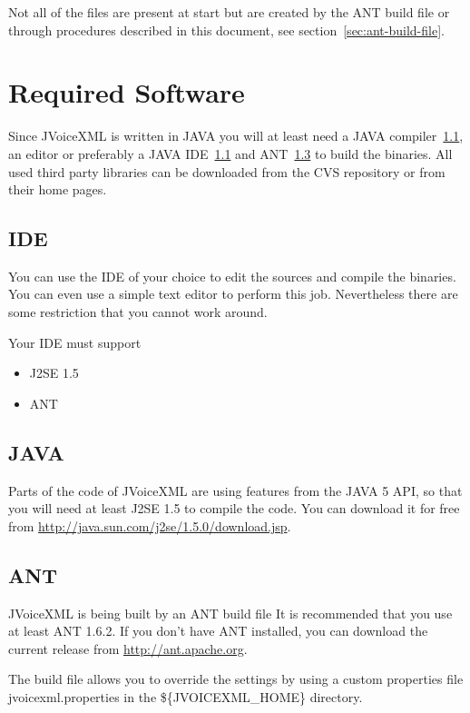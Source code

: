 \documentclass[11pt,a4paper]{article}
\begin{document}
Not all of the files are present at start but are created by the
ANT build file or through procedures described in this 
document, see section~\ref{sec:ant-build-file}.

\section{Required Software}
\label{sec:required-software}

Since JVoiceXML is written in JAVA you will at least need a
JAVA compiler~\ref{sec:ide}, an editor or preferably a JAVA
IDE~\ref{sec:ide} and ANT~\ref{sec:ant} to build the binaries.
All used third party libraries can be downloaded from the CVS 
repository or from their home pages.

\subsection{IDE}
\label{sec:ide}

You can use the IDE of your choice to edit the sources and compile the 
binaries. You can even use a simple text editor to perform this job.
Nevertheless there are some restriction that you cannot work around.

Your IDE must support

\begin{itemize}
\item J2SE 1.5
\item ANT
\end{itemize}

\subsection{JAVA}
\label{sec:java}

Parts of the code of JVoiceXML are using features from the JAVA 5 API, so that
you will need at least J2SE 1.5 to compile the code. You can download it
for free from \url{http://java.sun.com/j2se/1.5.0/download.jsp}.

\subsection{ANT}
\label{sec:ant}

JVoiceXML is being built by an ANT build file It is recommended that
you use at least ANT 1.6.2. 
If you don't have ANT installed, you can download the current release
from \url{http://ant.apache.org}.

The build file allows you to override the settings by using a custom 
properties file jvoicexml.properties in the \$\{JVOICEXML\_HOME\}
directory.
\end{document}

